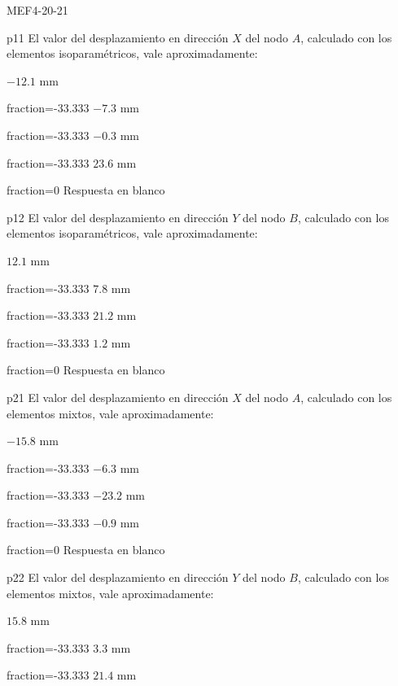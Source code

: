 \documentclass[a4paper]{article}
\begin{document}
\begin{quiz}{MEF4-20-21}

\begin{multi}{p11}
El valor del desplazamiento en direcci\'on $X$ del nodo $A$,
calculado con los elementos isoparam\'etricos, vale aproximadamente:
	\item* $-12.1$ mm
	\item[fraction=-33.333] $-7.3$ mm
	\item[fraction=-33.333] $-0.3$ mm
	\item[fraction=-33.333] $23.6$ mm
	\item[fraction=0] Respuesta en blanco
\end{multi}
\begin{multi}{p12}
	El valor del desplazamiento en direcci\'on $Y$ del nodo $B$,
	calculado con los elementos isoparam\'etricos, vale aproximadamente:
	\item* $12.1$ mm
	\item[fraction=-33.333] $7.8$ mm
	\item[fraction=-33.333] $21.2$ mm
	\item[fraction=-33.333] $1.2$ mm
	\item[fraction=0] Respuesta en blanco
\end{multi}
\begin{multi}{p21}
	El valor del desplazamiento en direcci\'on $X$ del nodo $A$,
	calculado con los elementos mixtos, vale aproximadamente:
	\item* $-15.8$ mm
	\item[fraction=-33.333] $-6.3$ mm
	\item[fraction=-33.333] $-23.2$ mm
	\item[fraction=-33.333] $-0.9$ mm
	\item[fraction=0] Respuesta en blanco
\end{multi}
\begin{multi}{p22}
	El valor del desplazamiento en direcci\'on $Y$ del nodo $B$,
	calculado con los elementos mixtos, vale aproximadamente:
	\item* $15.8$ mm
	\item[fraction=-33.333] $3.3$ mm
	\item[fraction=-33.333] $21.4$ mm

\end{multi}
\end{quiz}
\end{document}

